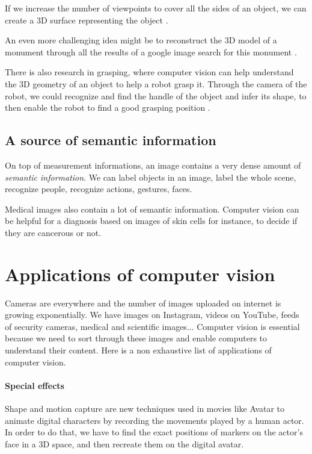 \documentclass{article}
\begin{document}
If we increase the number of viewpoints to cover all the sides of an object, we can create a 3D surface representing the object \cite{multipleview}.

An even more challenging idea might be to reconstruct the 3D model of a monument through all the results of a google image search for this monument \cite{multicommunity}.

There is also research in grasping, where computer vision can help understand the 3D geometry of an object to help a robot grasp it. Through the camera of the robot, we could recognize and find the handle of the object and infer its shape, to then enable the robot to find a good grasping position \cite{grasping}.


\subsection{A source of semantic information}

On top of measurement informations, an image contains a very dense amount of \textit{semantic information}. We can label objects in an image, label the whole scene, recognize people, recognize actions, gestures, faces.

Medical images also contain a lot of semantic information. Computer vision can be helpful for a diagnosis based on images of skin cells for instance, to decide if they are cancerous or not.



\section{Applications of computer vision} \label{applications}

Cameras are everywhere and the number of images uploaded on internet is growing exponentially. We have images on Instagram, videos on YouTube, feeds of security cameras, medical and scientific images... Computer vision is essential because we need to sort through these images and enable computers to understand their content. Here is a non exhaustive list of applications of computer vision.


\paragraph{Special effects}
Shape and motion capture are new techniques used in movies like Avatar to animate digital characters by recording the movements played by a human actor. In order to do that, we have to find the exact positions of markers on the actor's face in a 3D space, and then recreate them on the digital avatar.
\end{document}
